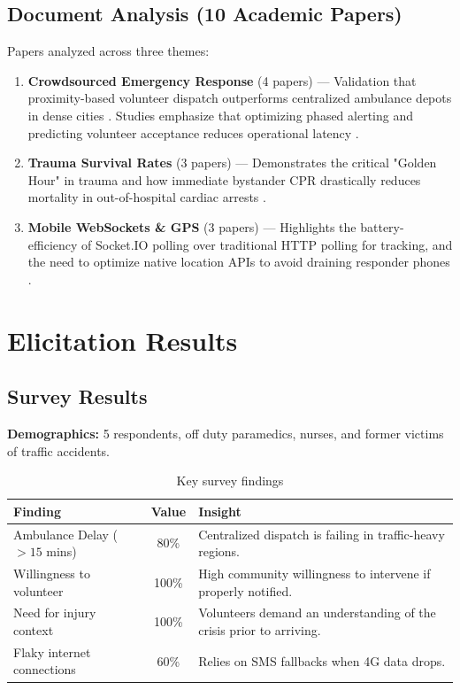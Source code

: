 \documentclass[12pt,a4paper]{article}
\begin{document}
\subsection{Document Analysis (10 Academic Papers)}
Papers analyzed across three themes:
\begin{enumerate}[nosep]
    \item \textbf{Crowdsourced Emergency Response} (4 papers) --- Validation that proximity-based volunteer dispatch outperforms centralized ambulance depots in dense cities \cite{zijlko2021, lee2022, smith2020}. Studies emphasize that optimizing phased alerting and predicting volunteer acceptance reduces operational latency \cite{lee2022}.
    \item \textbf{Trauma Survival Rates} (3 papers) --- Demonstrates the critical "Golden Hour" in trauma \cite{lerner2001} and how immediate bystander CPR drastically reduces mortality in out-of-hospital cardiac arrests \cite{hasselqvist2015, drennan2014}.
    \item \textbf{Mobile WebSockets \& GPS} (3 papers) --- Highlights the battery-efficiency of Socket.IO polling over traditional HTTP polling for tracking, and the need to optimize native location APIs to avoid draining responder phones \cite{pimentel2019, koutsonikola2015, zhang2020}.
\end{enumerate}

\section{Elicitation Results}

\subsection{Survey Results}
\textbf{Demographics:} 5 respondents, off duty paramedics, nurses, and former victims of traffic accidents. 

\begin{table}[h!]
\centering
\small
\begin{tabularx}{\textwidth}{|l|c|X|}
\hline
\rowcolor{lightorange}
\textbf{Finding} & \textbf{Value} & \textbf{Insight} \\
\hline
Ambulance Delay ($>15$ mins) & 80\% & Centralized dispatch is failing in traffic-heavy regions. \\
\hline
Willingness to volunteer & 100\% & High community willingness to intervene if properly notified. \\
\hline
Need for injury context & 100\% & Volunteers demand an understanding of the crisis prior to arriving. \\
\hline
Flaky internet connections & 60\% & Relies on SMS fallbacks when 4G data drops. \\
\hline
\end{tabularx}
\caption{Key survey findings}
\end{table}
\end{document}
